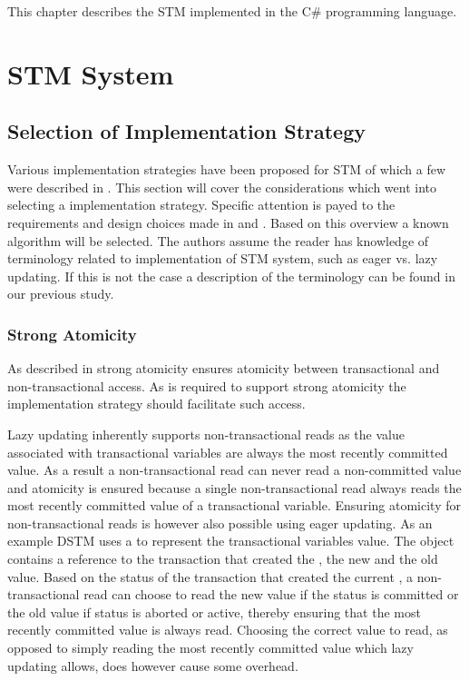 \makeatletter {}\makeatother
{}
This chapter describes the \ac{STM} implemented in the C\# programming language.
\label{chap:implementation}
\section{\acs{STM} System}
\subsection{Selection of Implementation Strategy}
Various implementation strategies have been proposed for \ac{STM} of which a few were described in . This section will cover the considerations which went into selecting a implementation strategy. Specific attention is payed to the requirements and design choices made in  and . Based on this overview a known algorithm will be selected. The authors assume the reader has knowledge of terminology related to implementation of \ac{STM} system, such as eager vs. lazy updating. If this is not the case a description of the terminology can be found in our previous study\cite[p. 53]{dpt907e14trending}.

\subsubsection{Strong Atomicity}
As described in  strong atomicity ensures atomicity between transactional and non-transactional access. As \stmnamesp is required to support strong atomicity the implementation strategy should facilitate such access.

Lazy updating inherently supports non-transactional reads as the value associated with transactional variables are always the most recently committed value\cite[p. 2084]{herlihy2011tm}\cite[p. 21]{harris2010transactional}. As a result a non-transactional read can never read a non-committed value and atomicity is ensured because a single non-transactional read always reads the most recently committed value of a transactional variable. Ensuring atomicity for non-transactional reads is however also possible using eager updating. As an example DSTM\cite{herlihy2003software} uses a  to represent the transactional variables value. The  object contains a reference to the transaction that created the , the new and the old value. Based on the status of the transaction that created the current , a non-transactional read can choose to read the new value if the status is committed or the old value if status is aborted or active, thereby ensuring that the most recently committed value is always read. Choosing the correct value to read, as opposed to simply reading the most recently committed value which lazy updating allows, does however cause some overhead.


